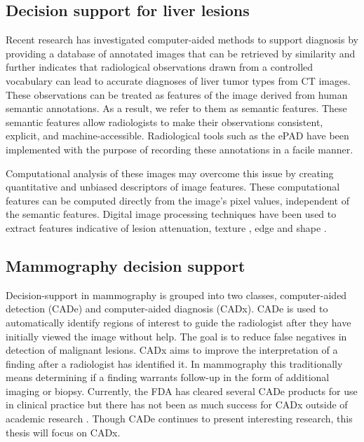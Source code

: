 \subsection{Decision support for liver lesions}
Recent research has investigated computer-aided methods to support diagnosis by providing a database of annotated images that can be retrieved by similarity\cite{Napel:2010es} and further indicates that radiological observations drawn from a controlled vocabulary can lead to accurate diagnoses of liver tumor types from CT images\cite{Korenblum:2011gx}. These observations can be treated as features of the image derived from human semantic annotations. As a result, we refer to them as semantic features. These semantic features allow radiologists to make their observations consistent, explicit, and machine-accessible. Radiological tools such as the ePAD \cite{Rubin:2008uz} have been implemented with the purpose of recording these annotations in a facile manner.

Computational analysis of these images may overcome this issue by creating quantitative and unbiased descriptors of image features. These computational features can be computed directly from the image's pixel values, independent of the semantic features. Digital image processing techniques have been used to extract features indicative of lesion attenuation, texture \cite{Strela:2002vq,Zhao:2005wb}, edge and shape \cite{Hong:2006ti,Manay:2006un,MRangayyan:2005td,Xu:2012bh}.


\subsection{Mammography decision support}
Decision-support in mammography is grouped into two classes, computer-aided detection (CADe) and computer-aided diagnosis (CADx). CADe is used to automatically identify regions of interest to guide the radiologist after they have initially viewed the image without help. The goal is to reduce false negatives in detection of malignant lesions. CADx aims to improve the interpretation of a finding after a radiologist has identified it. In mammography this traditionally means determining if a finding warrants follow-up in the form of additional imaging or biopsy. Currently, the FDA has cleared several CADe products for use in clinical practice but there has not been as much success for CADx outside of academic research \cite{Castellino:2005ke, Oliver:2010fm, Fujita:2008it}. Though CADe continues to present interesting research, this thesis will focus on CADx. 

